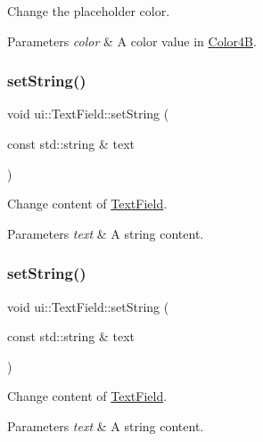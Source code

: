 Change the placeholder color. 


\begin{DoxyParams}{Parameters}
{\em color} & A color value in {\ttfamily \hyperlink{structColor4B}{Color4B}}. \\
\hline
\end{DoxyParams}
\mbox{\label{classui_1_1TextField_a7bd0a4832cf52651f5fccfb15d3c97c4}} 
\subsubsection{\texorpdfstring{set\+String()}{setString()}\hspace{0.1cm}{\footnotesize\ttfamily [1/2]}}
{\footnotesize\ttfamily void ui\+::\+Text\+Field\+::set\+String (\begin{DoxyParamCaption}\item[{const std\+::string \&}]{text }\end{DoxyParamCaption})}

Change content of \hyperlink{classui_1_1TextField}{Text\+Field}. 
\begin{DoxyParams}{Parameters}
{\em text} & A string content. \\
\hline
\end{DoxyParams}
\mbox{\label{classui_1_1TextField_a7bd0a4832cf52651f5fccfb15d3c97c4}} 
\subsubsection{\texorpdfstring{set\+String()}{setString()}\hspace{0.1cm}{\footnotesize\ttfamily [2/2]}}
{\footnotesize\ttfamily void ui\+::\+Text\+Field\+::set\+String (\begin{DoxyParamCaption}\item[{const std\+::string \&}]{text }\end{DoxyParamCaption})}

Change content of \hyperlink{classui_1_1TextField}{Text\+Field}. 
\begin{DoxyParams}{Parameters}
{\em text} & A string content. \\
\hline
\end{DoxyParams}
\mbox{\label{classui_1_1TextField_adcd37c99947c549a77ffbd3389e176b3}} 
